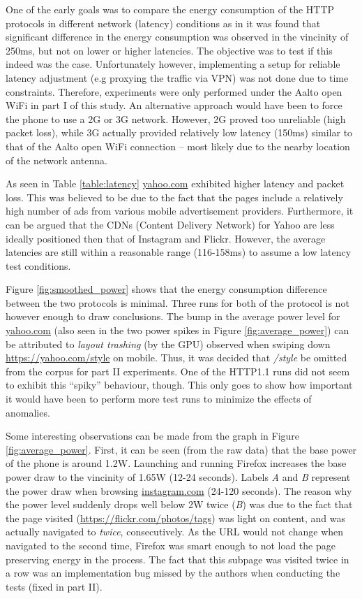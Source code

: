 \documentclass{article}
\begin{document}
One of the early goals was to compare the energy consumption of the HTTP protocols in different network (latency) conditions as in \cite{previous_work} it was found that significant difference in the energy consumption was observed in the vincinity of 250ms, but not on lower or higher latencies. The objective was to test if this indeed was the case. Unfortunately however, implementing a setup for reliable latency adjustment (e.g proxying the traffic via VPN) was not done due to time constraints. Therefore, experiments were only performed under the Aalto open WiFi in part I of this study. An alternative approach would have been to force the phone to use a 2G or 3G network. However, 2G proved too unreliable (high packet loss), while 3G actually provided relatively low latency (150ms) similar to that of the Aalto open WiFi connection -- most likely due to the nearby location of the network antenna.

As seen in Table \ref{table:latency} \url{yahoo.com} exhibited higher latency and packet loss. This was believed to be due to the fact that the pages include a relatively high number of ads from various mobile advertisement providers. Furthermore, it can be argued that the CDNs (Content Delivery Network) for Yahoo are less ideally positioned then that of Instagram and Flickr. However, the average latencies are still within a reasonable range (116-158ms) to assume a low latency test conditions.

Figure \ref{fig:smoothed_power} shows that the energy consumption difference between the two protocols is minimal. Three runs for both of the protocol is not however enough to draw conclusions. The bump in the average power level for \url{yahoo.com} (also seen in the two power spikes in Figure \ref{fig:average_power}) can be attributed to \emph{layout trashing} (by the GPU) observed when swiping down \url{https://yahoo.com/style} on mobile. Thus, it was decided that \emph{/style} be omitted from the corpus for part II experiments. One of the HTTP1.1 runs did not seem to exhibit this ``spiky'' behaviour, though. This only goes to show how important it would have been to perform more test runs to minimize the effects of anomalies.

Some interesting observations can be made from the graph in Figure \ref{fig:average_power}. First, it can be seen (from the raw data) that the base power of the phone is around 1.2W. Launching and running Firefox increases the base power draw to the vincinity of 1.65W (12-24 seconds). Labels \emph{A}  and \emph{B} represent the power draw when browsing \url{instagram.com} (24-120 seconds). The reason why the power level suddenly drops well below 2W twice (\emph{B}) was due to the fact that the page visited (\url{https://flickr.com/photos/tags}) was light on content, and was actually navigated to \emph{twice}, consecutively. As the URL would not change when navigated to the second time, Firefox was smart enough to not load the page preserving energy in the process. The fact that this subpage was visited twice in a row was an implementation bug missed by the authors when conducting the tests (fixed in part II).
\end{document}
